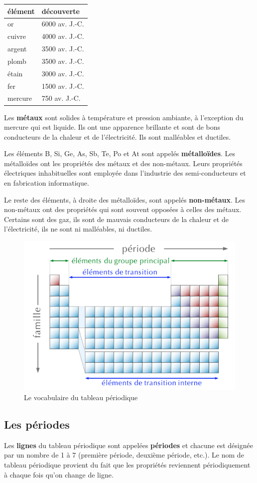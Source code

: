 \documentclass[
  11pt,
  french,
  a4paper,
  openany]{book}
\begin{document}
\begin{longtable}[]{@{}ll@{}}
\toprule
élément & découverte\tabularnewline
\midrule
\endhead
or & 6000 av. J.-C.\tabularnewline
cuivre & 4000 av. J.-C.\tabularnewline
argent & 3500 av. J.-C.\tabularnewline
plomb & 3500 av. J.-C.\tabularnewline
étain & 3000 av. J.-C.\tabularnewline
fer & 1500 av. J.-C.\tabularnewline
mercure & 750 av. J.-C.\tabularnewline
\bottomrule
\end{longtable}

Les \textbf{métaux} sont solides à température et pression ambiante, à l'exception du mercure qui est liquide. Ils ont une apparence brillante et sont de bons conducteurs de la chaleur et de l'électricité. Ils sont malléables et ductiles.

Les éléments B, Si, Ge, As, Sb, Te, Po et At sont appelés \textbf{métalloïdes}. Les métalloïdes ont les propriétés des métaux et des non-métaux. Leurs propriétés électriques inhabituelles sont employée dans l'industrie des semi-conducteurs et en fabrication informatique.

Le reste des éléments, à droite des métalloïdes, sont appelés \textbf{non-métaux}. Les non-métaux ont des propriétés qui sont souvent opposées à celles des métaux. Certains sont des gaz, ils sont de mauvais conducteurs de la chaleur et de l'électricité, ils ne sont ni malléables, ni ductiles.

\begin{figure}

{\centering \includegraphics[width=0.45\linewidth]{images/tpe-empty} 

}

\caption{Le vocabulaire du tableau périodique}\label{fig:tpe-empty}
\end{figure}

\hypertarget{les-puxe9riodes}{%
\subsection{Les périodes}\label{les-puxe9riodes}}

Les \textbf{lignes} du tableau périodique sont appelées \textbf{périodes} et chacune est désignée par un nombre de 1 à 7 (première période, deuxième période, etc.). Le nom de tableau périodique provient du fait que les propriétés reviennent périodiquement à chaque fois qu'on change de ligne.
\end{document}
